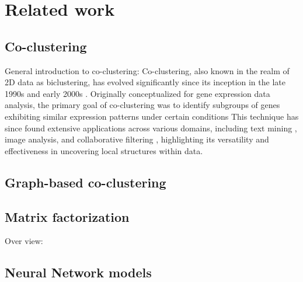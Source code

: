 

\section{Related work}

\subsection{Co-clustering}

General introduction to co-clustering:
Co-clustering, also known in the realm of 2D data as biclustering, has evolved significantly since its inception in the late 1990s and early 2000s \cite{cheng2000BiclusteringExpressionData}.
Originally conceptualized for gene expression data analysis, the primary goal of co-clustering was to identify subgroups of genes exhibiting similar expression patterns under certain conditions \cite{madeira2004BiclusteringAlgorithmsBiological}
This technique has since found extensive applications across various domains, including text mining \cite{siklosi2012ContentbasedTrustBias, song2013ConstrainedTextCoclustering}, image analysis\cite{khan2020CoClusteringRevealSalient}, and collaborative filtering \cite{daruru2009PervasiveParallelismData}, highlighting its versatility and effectiveness in uncovering local structures within data.

\subsection{Graph-based co-clustering}
\cite{kluger2003SpectralBiclusteringMicroarray, sun2014BiforceLargescaleBicluster,kim2022ABCAttributedBipartite}


\subsection{Matrix factorization}
Over view: \cite{lin2019OverviewCoClusteringMatrix}
\subsection{Neural Network models}
\cite{dongkuanxu2019DeepCoClustering}


